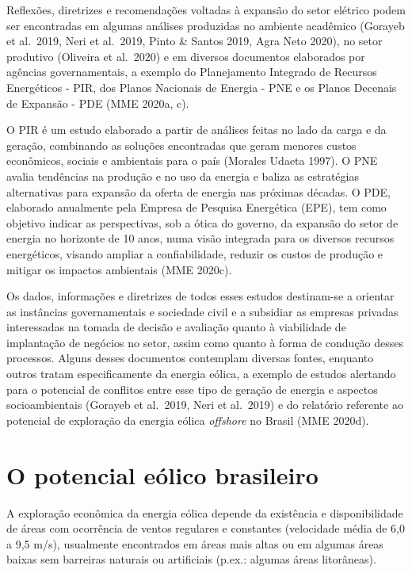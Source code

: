 \documentclass[
  oneside]{scrbook}
\begin{document}
Reflexões, diretrizes e recomendações voltadas à expansão do setor elétrico podem ser encontradas em algumas análises produzidas no ambiente acadêmico (Gorayeb et al.~2019, Neri et al.~2019, Pinto \& Santos 2019, Agra Neto 2020), no setor produtivo (Oliveira et al.~2020) e em diversos documentos elaborados por agências governamentais, a exemplo do Planejamento Integrado de Recursos Energéticos - PIR, dos Planos Nacionais de Energia - PNE e os Planos Decenais de Expansão - PDE (MME 2020a, c).

O PIR é um estudo elaborado a partir de análises feitas no lado da carga e da geração, combinando as soluções encontradas que geram menores custos econômicos, sociais e ambientais para o país (Morales Udaeta 1997). O PNE avalia tendências na produção e no uso da energia e baliza as estratégias alternativas para expansão da oferta de energia nas próximas décadas. O PDE, elaborado anualmente pela Empresa de Pesquisa Energética (EPE), tem como objetivo indicar as perspectivas, sob a ótica do governo, da expansão do setor de energia no horizonte de 10 anos, numa visão integrada para os diversos recursos energéticos, visando ampliar a confiabilidade, reduzir os custos de produção e mitigar os impactos ambientais (MME 2020c).

Os dados, informações e diretrizes de todos esses estudos destinam-se a orientar as instâncias governamentais e sociedade civil e a subsidiar as empresas privadas interessadas na tomada de decisão e avaliação quanto à viabilidade de implantação de negócios no setor, assim como quanto à forma de condução desses processos. Alguns desses documentos contemplam diversas fontes, enquanto outros tratam especificamente da energia eólica, a exemplo de estudos alertando para o potencial de conflitos entre esse tipo de geração de energia e aspectos socioambientais (Gorayeb et al.~2019, Neri et al.~2019) e do relatório referente ao potencial de exploração da energia eólica \emph{offshore} no Brasil (MME 2020d).

\hypertarget{o-potencial-euxf3lico-brasileiro}{%
\section{O potencial eólico brasileiro}\label{o-potencial-euxf3lico-brasileiro}}

A exploração econômica da energia eólica depende da existência e disponibilidade de áreas com ocorrência de ventos regulares e constantes (velocidade média de 6,0 a 9,5 m/s), usualmente encontrados em áreas mais altas ou em algumas áreas baixas sem barreiras naturais ou artificiais (p.ex.: algumas áreas litorâneas).
\end{document}

